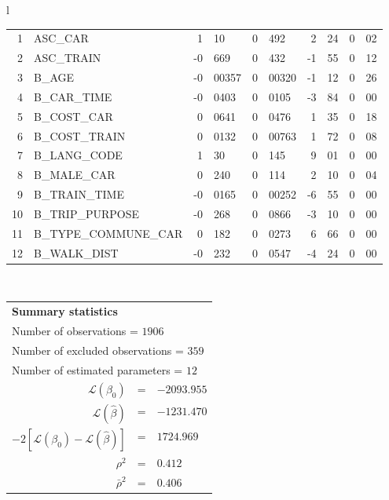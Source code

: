 \begin{tabular}{l}
\begin{tabular}{rlr@{.}lr@{.}lr@{.}lr@{.}l}
1 & ASC_CAR & 1&10 & 0&492 & 2&24 & 0&02\\
2 & ASC_TRAIN & -0&669 & 0&432 & -1&55 & 0&12\\
3 & B_AGE & -0&00357 & 0&00320 & -1&12 & 0&26\\
4 & B_CAR_TIME & -0&0403 & 0&0105 & -3&84 & 0&00\\
5 & B_COST_CAR & 0&0641 & 0&0476 & 1&35 & 0&18\\
6 & B_COST_TRAIN & 0&0132 & 0&00763 & 1&72 & 0&08\\
7 & B_LANG_CODE & 1&30 & 0&145 & 9&01 & 0&00\\
8 & B_MALE_CAR & 0&240 & 0&114 & 2&10 & 0&04\\
9 & B_TRAIN_TIME & -0&0165 & 0&00252 & -6&55 & 0&00\\
10 & B_TRIP_PURPOSE & -0&268 & 0&0866 & -3&10 & 0&00\\
11 & B_TYPE_COMMUNE_CAR & 0&182 & 0&0273 & 6&66 & 0&00\\
12 & B_WALK_DIST & -0&232 & 0&0547 & -4&24 & 0&00\\
\hline
\end{tabular}
\\
\begin{tabular}{rcl}
\multicolumn{3}{l}{\bf Summary statistics}\\
\multicolumn{3}{l}{ Number of observations = $1906$} \\
\multicolumn{3}{l}{ Number of excluded observations = $359$} \\
\multicolumn{3}{l}{ Number of estimated  parameters = $12$} \\
 $\mathcal{L}(\beta_0)$ &=&  $-2093.955$ \\
 $\mathcal{L}(\hat{\beta})$ &=& $-1231.470 $  \\
 $-2[\mathcal{L}(\beta_0) -\mathcal{L}(\hat{\beta})]$ &=& $1724.969$ \\
    $\rho^2$ &=&   $0.412$ \\
    $\bar{\rho}^2$ &=&    $0.406$ \\
\end{tabular}
  \end{tabular}
